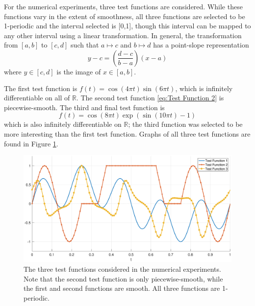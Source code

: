 \documentclass[12pt]{article}
\newcommand{\fcon}{f}
\begin{document}
For the numerical experiments, three test functions are considered. While these functions vary in the extent of smoothness, all three functions are selected to be 1-periodic and the interval selected is [0,1], though this interval can be mapped to any other interval using a linear transformation. In general, the transformation from $[a,b]$ to $[c,d]$ such that $a \mapsto c$ and $b \mapsto d$ has a point-slope representation
\[y - c = \left(\frac{d-c}{b-a}\right)(x - a)\]
where $y \in [c,d]$ is the image of $x \in [a,b]$. \par
The first test function is $\fcon(t) = \cos(4\pi{t})\sin(6\pi{t})$, which is infinitely differentiable on all of $\mathbb{R}$. The second test function \eqref{eq:Test Function 2} is piecewise-smooth. The third and final test function is
\begin{equation}
\fcon(t) = \cos(8\pi{t})\exp(\sin(10\pi{t})-1)
\label{eq:Test Function 3}
\end{equation}
which is also infinitely differentiable on $\mathbb{R}$; the third function was selected to be more interesting than the first test function. Graphs of all three test functions are found in Figure \ref{TestFunctions}.  \par

\begin{figure}
	\centerline{\includegraphics[scale = 0.45]{Figures/TestFunctions1D.eps}}
\caption{The three test functions considered in the numerical experiments. Note that the second test function is only piecewise-smooth, while the first and second functions are smooth. All three functions are 1-periodic.}
\label{TestFunctions}
\end{figure}
\end{document}
